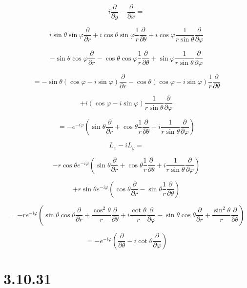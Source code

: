 \documentclass[12pt]{article}
\begin{document}
\[
    i \frac{\partial}{\partial y} - \frac{\partial}{\partial x} =
\]

\[
    i  \sin{\theta} \sin{\varphi} \frac{\partial}{\partial r}
    + i \cos{\theta} \sin{\varphi} \frac{1}{r} \frac{\partial}{\partial \theta}
    + i \cos{\varphi} \frac{1}{r \sin{\theta}} \frac{\partial}{\partial \varphi}
\]

\[
    - \sin{\theta} \cos{\varphi} \frac{\partial}{\partial r}
    - \cos{\theta} \cos{\varphi} \frac{1}{r} \frac{\partial}{\partial \theta}
    + \sin{\varphi} \frac{1}{r \sin{\theta}} \frac{\partial}{\partial \varphi}
\]

\[
    = -\sin{\theta} \left(\cos{\varphi} - i \sin{\varphi}\right) \frac{\partial}{\partial r}
    - \cos{\theta} \left(\cos{\varphi} - i \sin{\varphi}\right) \frac{1}{r} \frac{\partial}{\partial \theta}
\]

\[
    + i \left(\cos{\varphi} - i \sin{\varphi}\right) \frac{1}{r \sin{\theta}} \frac{\partial}{\partial \varphi}
\]

\[
    = - e^{-i \varphi}
    \left(
    \sin{\theta} \frac{\partial}{\partial r}
    + \cos{\theta} \frac{1}{r} \frac{\partial}{\partial \theta}
    + i \frac{1}{r \sin{\theta}} \frac{\partial}{\partial \varphi}
    \right)
\]

\[
    L_x - i L_y =
\]

\[
    - r \cos{\theta} e^{-i \varphi}
    \left(
    \sin{\theta} \frac{\partial}{\partial r}
    + \cos{\theta} \frac{1}{r} \frac{\partial}{\partial \theta}
    + i \frac{1}{r \sin{\theta}} \frac{\partial}{\partial \varphi}
    \right)
\]

\[
    + r \sin{\theta} e^{-i \varphi}
    \left(
    \cos{\theta} \frac{\partial}{\partial r} - \sin{\theta} \frac{1}{r} \frac{\partial}{\partial \theta}
    \right)
\]

\[
    = - r e^{-i \varphi}
    \left(
    \sin{\theta} \cos{\theta} \frac{\partial}{\partial r}
    + \frac{\cos^2{\theta}}{r} \frac{\partial}{\partial \theta}
    + i \frac{\cot{\theta}}{r}\frac{\partial}{\partial \varphi}
    - \sin{\theta} \cos{\theta} \frac{\partial}{\partial r}
    + \frac{\sin^2{\theta}}{r} \frac{\partial}{\partial \theta}
    \right)
\]

\[
    = - e^{-i \varphi}
    \left(
    \frac{\partial}{\partial \theta}
    - i \cot{\theta}\frac{\partial}{\partial \varphi}
    \right)
\]

\section{3.10.31}
\end{document}

